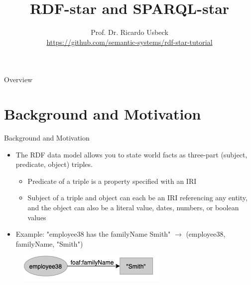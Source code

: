 \documentclass[aspectratio=169]{beamer}
\title[Ontologies]{RDF-star and SPARQL-star}
\author[Prof. Dr. R. Usbeck]{Prof. Dr. Ricardo Usbeck\\
\url{https://github.com/semantic-systems/rdf-star-tutorial}}
\date{}
\begin{document}
\begin{frame}
\titlepage
\end{frame}

\begin{frame}{Overview}{\quad}
\tableofcontents
\end{frame}

\section{Background and Motivation}
\begin{frame}{Background and Motivation}
    \begin{itemize}
        \item The RDF data model allows you to state world facts as three-part (subject, predicate, object) triples.
        \begin{itemize}
            \item Predicate of a triple is a property specified with an IRI
            \item Subject of a triple and object can each be an IRI referencing any entity, and the object can also be a literal value, dates, numbers, or boolean values
        \end{itemize}
        \item Example: "employee38 has the familyName Smith" $\rightarrow$ (employee38, familyName, "Smith")
    \end{itemize}
    \begin{figure}
        \centering
        \includegraphics[scale=0.5]{images/Example-1.png}
    \end{figure}
\end{frame}
\end{document}
